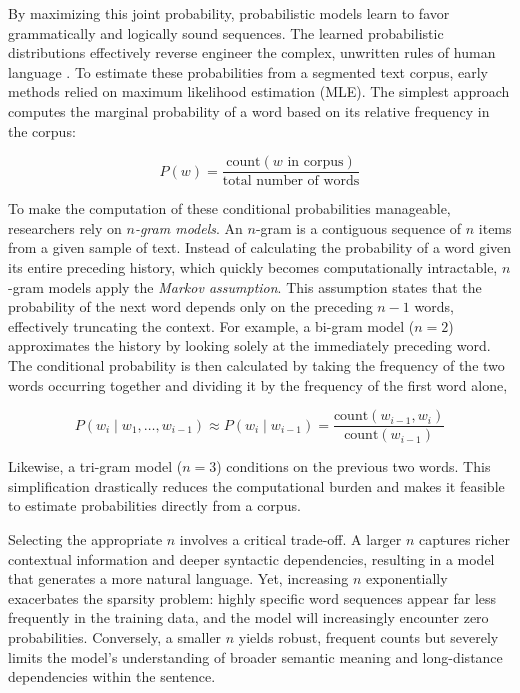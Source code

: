 By maximizing this joint probability, probabilistic models learn to favor grammatically and logically sound sequences. The learned probabilistic distributions  effectively reverse engineer the complex, unwritten rules of human language \citep{manning1999foundations}. To estimate these probabilities from a segmented text corpus, early methods relied on maximum likelihood estimation (MLE). The simplest approach computes the marginal probability of a word based on its relative frequency in the corpus:

\begin{equation}
\label{eq:mle-word-prob}
    P(w) = \frac{\text{count}(w \text{ in corpus})}{\text{total number of words}}
\end{equation}

To make the computation of these conditional probabilities manageable, researchers rely on \emph{$n$-gram models}. An $n$-gram is a contiguous sequence of $n$ items from a given sample of text. Instead of calculating the probability of a word given its entire preceding history, which quickly becomes computationally intractable, $n$-gram models apply the \emph{Markov assumption}. This assumption states that the probability of the next word depends only on the preceding $n-1$ words, effectively truncating the context. For example, a bi-gram model ($n=2$) approximates the history by looking solely at the immediately preceding word. The conditional probability is then calculated by taking the frequency of the two words occurring together and dividing it by the frequency of the first word alone, 

\begin{equation}
    P(w_i \mid w_1, \dots, w_{i-1}) \approx P(w_i \mid w_{i-1}) = \frac{\text{count}(w_{i-1}, w_i)}{\text{count}(w_{i-1})}
\end{equation}

Likewise, a tri-gram model ($n=3$) conditions on the previous two words. This simplification drastically reduces the computational burden and makes it feasible to estimate probabilities directly from a corpus. 

Selecting the appropriate $n$ involves a critical trade-off. A larger $n$ captures richer contextual information and deeper syntactic dependencies, resulting in a model that generates a more natural language. Yet, increasing $n$ exponentially exacerbates the sparsity problem: highly specific word sequences appear far less frequently in the training data, and the model will increasingly encounter zero probabilities. Conversely, a smaller $n$ yields robust, frequent counts but severely limits the model's understanding of broader semantic meaning and long-distance dependencies within the sentence.

